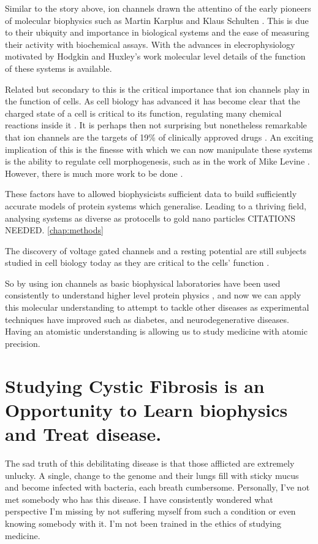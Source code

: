 Similar to the story above, ion channels drawn the attentino of the early pioneers of molecular biophysics such as Martin Karplus and Klaus Schulten \cite{}. This is due to their ubiquity and importance in biological systems and the ease of measuring their activity with biochemical assays. With the advances in elecrophysiology motivated by Hodgkin and Huxley's work molecular level details of the function of these systems is available. 

Related but secondary to this is the critical importance that ion channels play in the function of cells. As cell biology has advanced it has become clear that the charged state of a cell is critical to its function, regulating many chemical reactions inside it \cite{}. It is perhaps then not surprising but nonetheless remarkable that ion channels are the targets of 19\% of clinically approved drugs \cite{santos2017}. An exciting implication of this is the finesse with which we can now manipulate these systems is the ability to regulate cell morphogenesis, such as in the work of Mike Levine \cite{bizzarri2019, blackiston2009}. However, there is much more work to be done \cite{}.

These factors have to allowed biophysicists sufficient data to build sufficiently accurate models of protein systems which generalise. Leading to a thriving field, analysing systems as diverse as protocells to gold nano particles CITATIONS NEEDED. \ref{chap:methods}

The discovery of voltage gated channels and a resting potential are still subjects studied in cell biology today as they are critical to the cells' function \cite{}.

So by using ion channels as basic biophysical laboratories have been used consistently to understand higher level protein physics \cite{}, and now we can apply this molecular understanding to attempt to tackle other diseases as experimental techniques have improved such as diabetes, and neurodegenerative diseases. Having an atomistic understanding is allowing us to study medicine with atomic precision.


\section{Studying Cystic Fibrosis is an Opportunity to Learn biophysics and Treat disease.} 

The sad truth of this debilitating disease is that those afflicted are extremely unlucky. A single, change to the genome and their lungs fill with sticky mucus and become infected with bacteria, each breath cumbersome. Personally, I've not met somebody who has this disease. I have consistently wondered what perspective I'm missing by not suffering myself from such a condition or even knowing somebody with it. I'm not been trained in the ethics of studying medicine.

